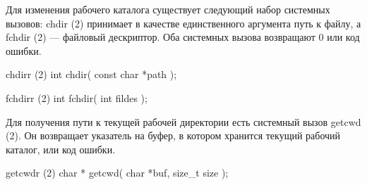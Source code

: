 Для изменения рабочего каталога существует следующий набор системных вызовов: chdir (2) принимает в качестве единственного аргумента путь к файлу, а fchdir (2) --- файловый дескриптор. Оба системных вызова возвращают 0 или код ошибки.

\begin{CCode}{chdirr (2)}
	int chdir(
		const char *path
	); \end{CCode}

\begin{CCode}{fchdirr (2)}
	int fchdir(
		int fildes
	); \end{CCode}

Для получения пути к текущей рабочей директории есть системный вызов getcwd (2). Он возвращает указатель на буфер, в котором хранится текущий рабочий каталог, или код ошибки.

\begin{CCode}{getcwdr (2)}
	char * getcwd(
		char *buf, 
		size_t size
	); \end{CCode}